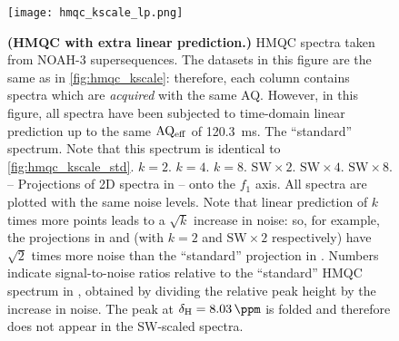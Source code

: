 \begin{figure}
    \centering
    \texttt{[image: hmqc\_kscale\_lp.png]}
    {\label{fig:hmqc_kscale_lp_std}}
    {\label{fig:hmqc_kscale_lp_k2}}
    {\label{fig:hmqc_kscale_lp_k4}}
    {\label{fig:hmqc_kscale_lp_k8}}
    {\label{fig:hmqc_kscale_lp_sw2}}
    {\label{fig:hmqc_kscale_lp_sw4}}
    {\label{fig:hmqc_kscale_lp_sw8}}
    {\label{fig:hmqc_kscale_lp_std_proj}}
    {\label{fig:hmqc_kscale_lp_k2_proj}}
    {\label{fig:hmqc_kscale_lp_k4_proj}}
    {\label{fig:hmqc_kscale_lp_k8_proj}}
    {\label{fig:hmqc_kscale_lp_sw2_proj}}
    {\label{fig:hmqc_kscale_lp_sw4_proj}}
    {\label{fig:hmqc_kscale_lp_sw8_proj}}
    \caption{
        \textbf{(HMQC with extra linear prediction.)}
        \nitrogen{} HMQC spectra taken from NOAH-3  supersequences.
        The datasets in this figure are the same as in \cref{fig:hmqc_kscale}: therefore, each column contains spectra which are \textit{acquired} with the same AQ.
        However, in this figure, all spectra have been subjected to time-domain linear prediction up to the same $\mathrm{AQ_{eff}}$ of \SI{120.3}{\ms}.
        \textbf{} The ``standard'' spectrum.
        Note that this spectrum is identical to \cref{fig:hmqc_kscale_std}.
        \textbf{} $k = 2$.
        \textbf{} $k = 4$.
        \textbf{} $k = 8$.
        \textbf{} $\mathrm{SW} \times 2$.
        \textbf{} $\mathrm{SW} \times 4$.
        \textbf{} $\mathrm{SW} \times 8$.
        \textbf{}--\textbf{} Projections of 2D spectra in -- onto the $f_1$ axis.
        All spectra are plotted with the same noise levels.
        Note that linear prediction of $k$ times more points leads to a $\sqrt{k}$ increase in noise: so, for example, the projections in  and  (with $k = 2$ and $\mathrm{SW \times 2}$ respectively) have $\sqrt{2}$ times more noise than the ``standard'' projection in .
        Numbers indicate signal-to-noise ratios relative to the ``standard'' HMQC spectrum in , obtained by dividing the relative peak height by the increase in noise.
        The peak at $\delta_{\ce{H}} = \SI{8.03}{\ppm}$ is folded and therefore does not appear in the SW-scaled spectra.
        \grami{}
    }
    \label{fig:hmqc_kscale_lp}
\end{figure}

